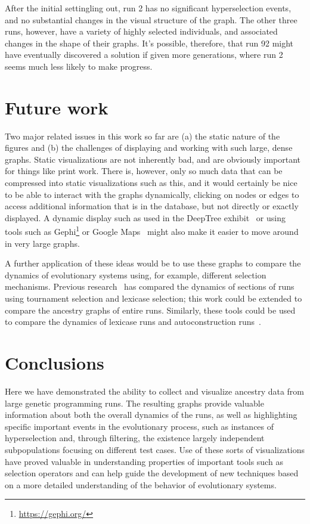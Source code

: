 \documentclass{sig-alternate}
\begin{document}
After the initial settingling out, run 2 has no
significant hyperselection events, and no substantial changes in the visual structure of
the graph. The other three runs, however, have a variety of highly selected individuals,
and associated changes in the shape of their graphs. It's possible, therefore, that run
92 might have eventually discovered a solution if given more generations,
where run 2 seems much less likely to make progress.

\section{Future work}
\label{sec:futurework}

Two major related issues in this work so far are (a) the static nature of the figures and (b) the 
challenges of displaying and working with such large, dense graphs. Static visualizations are not 
inherently bad, and are obviously important for things like print work. There is, however, only so
much data that can be compressed into static visualizations such as this, and it would certainly be
nice to be able to interact with the graphs dynamically, clicking on nodes or edges to access
additional information that is in the database, but not directly or exactly displayed. A dynamic
display such as used in the DeepTree exhibit~\cite{block2012deeptree} or using tools such as 
Gephi\footnote{\url{https://gephi.org/}} or Google Maps~\cite{embedInGoogleMaps} might also make 
it easier to move around in very large graphs.

A further application of these ideas would be to use these graphs to compare the dynamics of
evolutionary systems using, for example, different selection mechanisms. Previous 
research~\cite{McPhee:2015:GPTP} has compared the dynamics of sections of runs using
tournament selection and lexicase selection; this work could be extended to compare
the ancestry graphs of entire runs. Similarly, these tools could be used to compare
the dynamics of lexicase runs and autoconstruction runs~\cite{Spector:2016:GECCO}.

\section{Conclusions}
\label{sec:conclusions}

Here we have demonstrated the ability to collect and visualize ancestry data from large
genetic programming runs. The resulting graphs provide valuable information about both
the overall dynamics of the runs, as well as highlighting specific important events in the
evolutionary process, such as instances of hyperselection and, through filtering, the
existence largely independent subpopulations focusing on different test cases.
Use of these sorts of visualizations have proved valuable in
understanding properties of important tools such as selection operators and can help
guide the development of new techniques based on a more detailed understanding of the
behavior of evolutionary systems.
\end{document}
